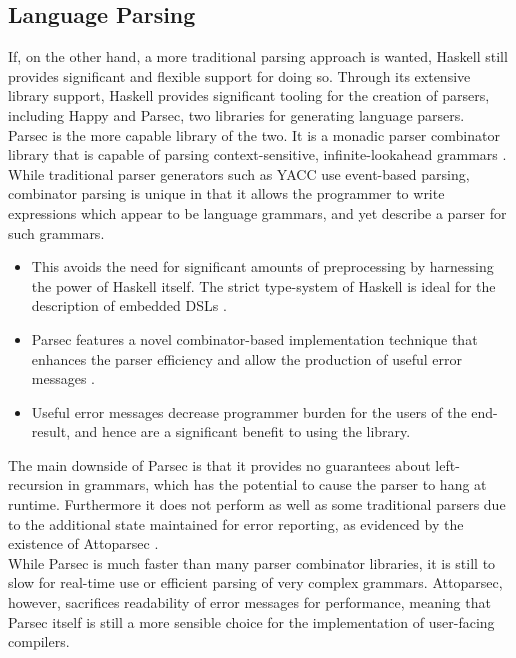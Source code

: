 \documentclass[a4paper,11pt]{report}
\begin{document}

\subsection{Language Parsing} %
\label{sub:language_parsing}
If, on the other hand, a more traditional parsing approach is wanted, Haskell still provides significant and flexible support for doing so. 
Through its extensive library support, Haskell provides significant tooling for the creation of parsers, including Happy and Parsec, two libraries for generating language parsers. \\

Parsec is the more capable library of the two.
It is a monadic parser combinator library that is capable of parsing context-sensitive, infinite-lookahead grammars \citep{leijen2001parsec}.
While traditional parser generators such as YACC use event-based parsing, combinator parsing is unique in that it allows the programmer to write expressions which appear to be language grammars, and yet describe a parser for such grammars.
\begin{itemize}
    \item This avoids the need for significant amounts of preprocessing by harnessing the power of Haskell itself. 
    The strict type-system of Haskell is ideal for the description of embedded DSLs \citep{swierstra2009combinator}.
    \item Parsec features a novel combinator-based implementation technique that enhances the parser efficiency and allow the production of useful error messages \citep{leijen2002parsec}.
    \item Useful error messages decrease programmer burden for the users of the end-result, and hence are a significant benefit to using the library. 
\end{itemize}

The main downside of Parsec is that it provides no guarantees about left-recursion in grammars, which has the potential to cause the parser to hang at runtime. 
Furthermore it does not perform as well as some traditional parsers due to the additional state maintained for error reporting, as evidenced by the existence of Attoparsec \citep{gummelt2011hindsight}. \\

While Parsec is much faster than many parser combinator libraries, it is still to slow for real-time use or efficient parsing of very complex grammars. 
Attoparsec, however, sacrifices readability of error messages for performance, meaning that Parsec itself is still a more sensible choice for the implementation of user-facing compilers. \\
\end{document}
